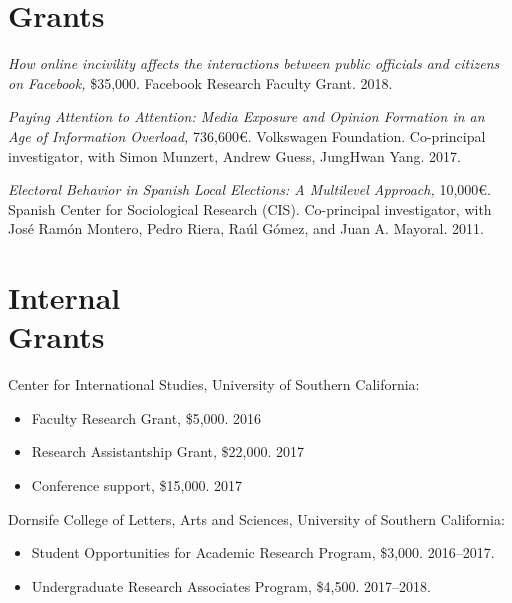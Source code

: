 \documentclass[margin,line,11pt]{resume}
\begin{document}
\begin{resume}
        \section{\mysidestyle Grants}
        
\textit{How online incivility affects the interactions between public officials and citizens on Facebook,} \$35,000. Facebook Research Faculty Grant. 2018.        
        
\textit{Paying Attention to Attention: Media Exposure and Opinion Formation in an Age of Information Overload,} 736,600\euro. Volkswagen Foundation. Co-principal investigator, with Simon Munzert, Andrew Guess, JungHwan Yang. 2017.

    \textit{Electoral Behavior in Spanish Local Elections: A Multilevel Approach,} 10,000\euro. Spanish Center for Sociological Research (CIS). Co-principal investigator, with Jos\'{e} Ram\'{o}n Montero, Pedro Riera, Ra\'{u}l G\'{o}mez, and Juan A. Mayoral. 2011.    

  

        \section{\mysidestyle Internal\\Grants}

Center for International Studies, University of Southern California:
\begin{itemize}
\item[] Faculty Research Grant, \$5,000. 2016
\vspace{-.15cm}
\item[] Research Assistantship Grant, \$22,000. 2017
\vspace{-.15cm}
\item[] Conference support, \$15,000. 2017
\end{itemize}
Dornsife College of Letters, Arts and Sciences, University of Southern California:
\begin{itemize}
\item[] Student Opportunities for Academic Research Program, \$3,000. 2016--2017.
\vspace{-.15cm}
\item[] Undergraduate Research Associates Program, \$4,500. 2017--2018.
\end{itemize}
 


\end{resume}
\end{document}
